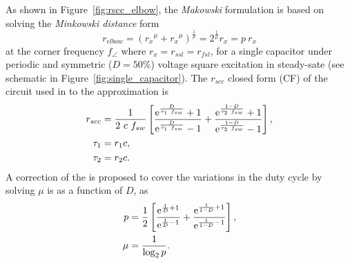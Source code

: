 \begin{SCfigure}[][!h]
\newcommand\pHeigh{3cm}
\newcommand\pWidth{5cm}
\centering

\caption[\emph{Makowski} approximation of the $r_{scc}$]{Graphic demonstration of the \emph{Minkowski distance} $p$ between the two asymptotic limits ($r_{ssl}$ and $r_{fsl}$), and the closed form (CF) of $r_{scc}$. }
\label{fig:rscc_elbow}
\end{SCfigure}
As shown in Figure~\ref{fig:rscc_elbow}, the \emph{Makowski} formulation is based on solving the \emph{Minkowski distance} form
\begin{equation}
r_{elbow} = \left( {r_x}^{\mu}+{r_x}^{\mu} \right) ^\frac{1}{\mu} = 2^\frac{1}{\mu} r_x = p~r_x
\label{eq:r_scc_II}
\end{equation}
at the corner frequency $f_{\angle}$ where $r_x = r_{ssl} = r_{fsl}$, for a single capacitor under periodic and symmetric ($D=50\%$) voltage square excitation in steady-sate (see schematic in Figure~\ref{fig:single_capacitor}). The $r_{scc}$ closed form (CF) of the circuit used in to the approximation is
\begin{align}
r_{scc} & =  \frac{1}{2~c~f_{sw}} \left[ \frac{\mathrm{e}^{\frac{D}{\tau_1~f_{sw}}}+1}{\mathrm{e}^{\frac{D}{\tau_1~f_{sw}}}-1} +
\frac{\mathrm{e}^{\frac{1-D}{\tau_2~f_{sw}}}+1}{\mathrm{e}^{\frac{1-D}{\tau_2~f_{sw}}}-1} \right],\\
\tau_1 &= r_1c,\\
\tau_2 &= r_2c.
\label{eq:r_scc_CF}
\end{align}
A correction of the \citeauthor{2012Makowski} is proposed to cover the variations in the duty cycle by solving $\mu$ is as a function of $D$, as 
\begin{align}
p & = \frac{1}{2} \left[ \frac{\mathrm{e}^{\frac{1}{D}+1}}{\mathrm{e}^{\frac{1}{D}-1}} + \frac{\mathrm{e}^{\frac{1}{1-D}+1}}{\mathrm{e}^{\frac{1}{1-D}-1}} \right], \label{eq:p}\\
\mu &= \frac{1}{\log_2 p}.
\label{eq:u_factor}
\end{align}
